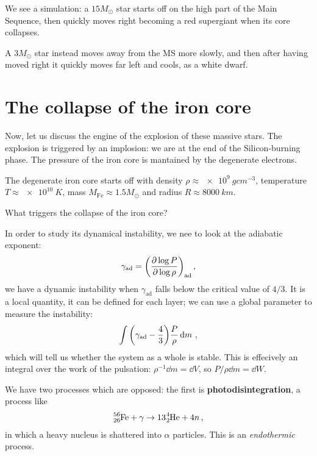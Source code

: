 \documentclass[main.tex]{subfiles}
\begin{document}
We see a simulation: a \(15 M_{\odot}  \) star starts off on the high part of the Main Sequence, then quickly moves right becoming a red supergiant when its core collapses.

A \(3 M_{\odot}\) star instead moves away from the MS more slowly, and then after having moved right it quickly moves far left and cools, as a white dwarf. 

\section{The collapse of the iron core}

Now, let us discuss the engine of the explosion of these massive stars. The explosion is triggered by an implosion: we are at the end of the Silicon-burning phase. 
The pressure of the iron core is mantained by the degenerate electrons. 

The degenerate iron core starts off with density \(\rho \approx
\SI{e9}{g cm^{-3}}\), temperature \(T \approx \SI{e10}{K}\), mass \(M _{\text{Fe}} \approx \num{1.5} M_{\odot}\) and radius \(R \approx \SI{8000}{km}\). 

What triggers the collapse of the iron core? 

In order to study its dynamical instability, we nee to look at the adiabatic exponent:
%
\begin{align}
  \gamma _{\text{ad}} = \qty(\pdv{\log P}{\log \rho })_{\text{ad}}
\,,
\end{align}
%
we have a dynamic instability when  \(\gamma _{\text{ad}}\) falls below the critical value of \(4/3\). 
It is a local quantity, it can be defined for each layer; we can use a global parameter to measure the instability: 
%
\begin{align}
  \int \qty(\gamma _{\text{ad}} - \frac{4}{3}) \frac{P}{\rho } \dd{m}
\,,
\end{align}
%
which will tell us whether the system as a whole is stable. 
This is effecively an integral over the work of the pulsation: \(\rho^{-1} \dd{m} = \dd{V}\), so \(P/\rho \dd{m} = \dd{W}\).

We have two processes which are opposed: the first is \textbf{photodisintegration}, a process like 
%
\begin{align}
\ce{^{56}_{26}Fe} + \gamma \rightarrow 
13 \ce{^{4}_{2}He} + 4n
\,,
\end{align}
%
in which a heavy nucleus is shattered into \(\alpha \) particles. This is an \emph{endothermic} process.
\end{document}
